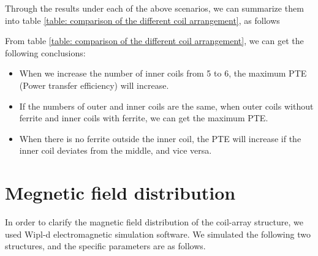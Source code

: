 Through the results under each of the above scenarios, we can summarize them into table \ref{table: comparison of the different coil arrangement}, as follows

From table \ref{table: comparison of the different coil arrangement}, we can get the following conclusions:
\begin{itemize}
    \item When we increase the number of inner coils from 5 to 6, the maximum PTE (Power transfer efficiency) will increase.
    \item If the numbers of outer and inner coils are the same, when outer coils without ferrite and inner coils with ferrite, we can get the maximum PTE.
    \item When there is no ferrite outside the inner coil, the PTE will increase if the inner coil deviates from the middle, and vice versa.
\end{itemize}

\section{Megnetic field distribution}
In order to clarify the magnetic field distribution of the coil-array structure, we used Wipl-d electromagnetic simulation software. We simulated the following two structures, and the specific parameters are as follows.


